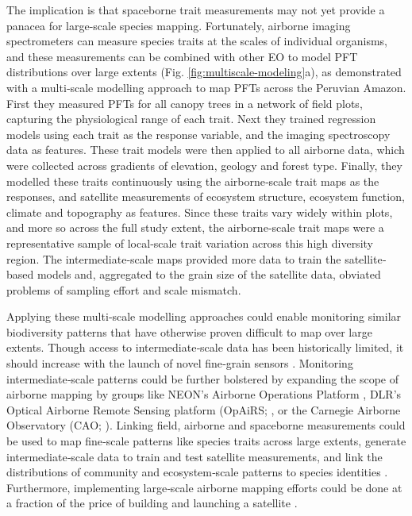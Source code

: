 The implication is that spaceborne trait measurements may not yet provide a panacea for large-scale species mapping. Fortunately, airborne imaging spectrometers can measure species traits at the scales of individual organisms, and these measurements can be combined with other EO to model PFT distributions over large extents (Fig. \ref{fig:multiscale-modeling}a), as \cite{Asner2016-qd} demonstrated with a multi‐scale modelling approach to map PFTs across the Peruvian Amazon. First they measured PFTs for all canopy trees in a network of field plots, capturing the physiological range of each trait. Next they trained regression models using each trait as the response variable, and the imaging spectroscopy data as features. These trait models were then applied to all airborne data, which were collected across gradients of elevation, geology and forest type. Finally, they modelled these traits continuously using the airborne‐scale trait maps as the responses, and satellite measurements of ecosystem structure, ecosystem function, climate and topography as features. Since these traits vary widely within plots, and more so across the full study extent, the airborne‐scale trait maps were a representative sample of local‐scale trait variation across this high diversity region. The intermediate‐scale maps provided more data to train the satellite‐based models and, aggregated to the grain size of the satellite data, obviated problems of sampling effort and scale mismatch.

Applying these multi‐scale modelling approaches could enable monitoring similar biodiversity patterns that have otherwise proven difficult to map over large extents. Though access to intermediate‐scale data has been historically limited, it should increase with the launch of novel fine‐grain sensors \cite{Malenovsky2012-nv}. Monitoring intermediate‐scale patterns could be further bolstered by expanding the scope of airborne mapping by groups like NEON's Airborne Operations Platform \cite{Keller2008-dl}, DLR's Optical Airborne Remote Sensing platform (OpAiRS; \cite{Baumgartner2012-sg, Leutner2012-uc}, or the Carnegie Airborne Observatory (CAO; \cite{Asner2012-qs}). Linking field, airborne and spaceborne measurements could be used to map fine‐scale patterns like species traits across large extents, generate intermediate‐scale data to train and test satellite measurements, and link the distributions of community and ecosystem‐scale patterns to species identities \cite{Clark2005-kr, Baldeck2015-jd}. Furthermore, implementing large‐scale airborne mapping efforts could be done at a fraction of the price of building and launching a satellite \cite{Mascaro2014-js}.

